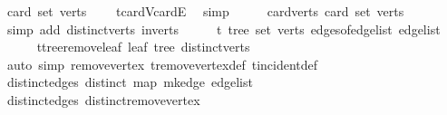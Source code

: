 \begin{isabellebody}
\ {\isachardoublequoteopen}card\ {\isacharparenleft}{\kern0pt}set\ verts{\isacharparenright}{\kern0pt}\ {\isasymge}\ {}{\isachardoublequoteclose}\ \isamarkupfalse%
\ t{\isachardot}{\kern0pt}card{\isacharunderscore}{\kern0pt}V{\isacharunderscore}{\kern0pt}card{\isacharunderscore}{\kern0pt}E\ \isamarkupfalse%
\ simp\isanewline
\ \ \isamarkupfalse%
\ \isamarkupfalse%
\ card{\isacharunderscore}{\kern0pt}verts{\isacharprime}{\kern0pt}{\isacharcolon}{\kern0pt}\ {\isachardoublequoteopen}card\ {\isacharparenleft}{\kern0pt}set\ {\isacharquery}{\kern0pt}verts{\isacharprime}{\kern0pt}{\isacharparenright}{\kern0pt}\ {\isasymge}\ {}{\isachardoublequoteclose}\ \isamarkupfalse%
\ {\isacharparenleft}{\kern0pt}simp\ add{\isacharcolon}{\kern0pt}\ distinct{\isacharunderscore}{\kern0pt}verts\ in{\isacharunderscore}{\kern0pt}verts{\isacharparenright}{\kern0pt}\isanewline
\ \ \isamarkupfalse%
\ \isamarkupfalse%
\ t{\isacharprime}{\kern0pt}{\isacharcolon}{\kern0pt}\ tree\ {\isachardoublequoteopen}set\ {\isacharquery}{\kern0pt}verts{\isacharprime}{\kern0pt}{\isachardoublequoteclose}\ {\isachardoublequoteopen}edges{\isacharunderscore}{\kern0pt}of{\isacharunderscore}{\kern0pt}edge{\isacharunderscore}{\kern0pt}list\ {\isacharquery}{\kern0pt}edge{\isacharunderscore}{\kern0pt}list{\isacharprime}{\kern0pt}{\isachardoublequoteclose}\isanewline
\ \ \ \ \isamarkupfalse%
\ t{\isachardot}{\kern0pt}tree{\isacharunderscore}{\kern0pt}remove{\isacharunderscore}{\kern0pt}leaf\ leaf\ tree\ distinct{\isacharunderscore}{\kern0pt}verts\ \isamarkupfalse%
\ {\isacharparenleft}{\kern0pt}auto\ simp{\isacharcolon}{\kern0pt}\ remove{\isacharunderscore}{\kern0pt}vertex\ t{\isachardot}{\kern0pt}remove{\isacharunderscore}{\kern0pt}vertex{\isacharunderscore}{\kern0pt}def\ t{\isachardot}{\kern0pt}incident{\isacharunderscore}{\kern0pt}def{\isacharparenright}{\kern0pt}\isanewline
\ \ \isamarkupfalse%
\ distinct{\isacharunderscore}{\kern0pt}edges{\isacharprime}{\kern0pt}{\isacharcolon}{\kern0pt}\ {\isachardoublequoteopen}distinct\ {\isacharparenleft}{\kern0pt}map\ mk{\isacharunderscore}{\kern0pt}edge\ {\isacharquery}{\kern0pt}edge{\isacharunderscore}{\kern0pt}list{\isacharprime}{\kern0pt}{\isacharparenright}{\kern0pt}{\isachardoublequoteclose}\ \isamarkupfalse%
\ distinct{\isacharunderscore}{\kern0pt}edges\ distinct{\isacharunderscore}{\kern0pt}remove{\isacharunderscore}{\kern0pt}vertex\ \isamarkupfalse%

\end{isabellebody}
